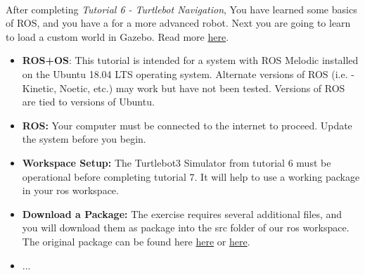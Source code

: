 \documentclass[12pt]{article}
\begin{document}
\begin{description}[labelindent=1cm]
	
	\item[\textbf{\underline{Overview:}}] \hfill \vspace{3mm}\\
	After completing {\it Tutorial 6 - Turtlebot Navigation}, You have learned some basics of ROS, and you have a for a more advanced robot. Next you are going to learn to load a custom world in Gazebo. Read more \href{http://gazebosim.org/tutorials?tut=ros_gzplugins}{here}.
	
	\item[\textbf{\underline{System Requirements:}}] \hfill \vspace{0mm}

\begin{itemize}
	\item {\bf ROS+OS}: This tutorial is intended for a system with ROS Melodic installed on the Ubuntu 18.04 LTS operating system. Alternate versions of ROS (i.e. - Kinetic, Noetic, etc.) may work but have not been tested. Versions of ROS are tied to versions of Ubuntu.
	\item {\bf ROS:} Your computer must be connected to the internet to proceed. Update the system before you begin.
	\item {\bf Workspace Setup:} The Turtlebot3 Simulator from tutorial 6 must be operational before completing tutorial 7. It will help to use a working package in your ros workspace. 
	\item {\bf Download a Package:} The exercise requires several additional files, and you will download them as package into the src folder of our ros workspace. The original package can be found here \href{https://github.com/ROBOTIS-GIT/turtlebot3_gazebo_plugin/tree/master/src}{here} or \href{git clone https://github.com/ROBOTIS-GIT/turtlebot3_simulations.git}{here}.
\end{itemize}

	
	\item[\textbf{\underline{Disclaimer:}}] \hfill \vspace{0mm}
	
	\begin{itemize}

		
		\item ...
	

	\end{itemize}
   
\item[\textbf{\underline{Part 1 - Download Turtlebot3 Brown Hall Package:}}] \hfill \vspace{0mm}   
   

\end{description}
\end{document}
